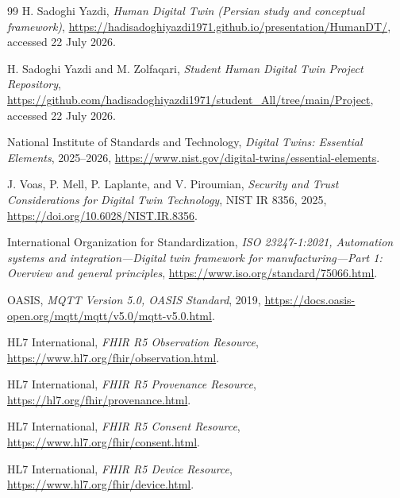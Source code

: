 \documentclass[11pt,a4paper]{article}
\begin{document}
\begin{thebibliography}{99}
H. Sadoghi Yazdi,
\textit{Human Digital Twin (Persian study and conceptual framework)},
\url{https://hadisadoghiyazdi1971.github.io/presentation/HumanDT/},
accessed 22 July 2026.

H. Sadoghi Yazdi and M. Zolfaqari,
\textit{Student Human Digital Twin Project Repository},
\url{https://github.com/hadisadoghiyazdi1971/student_All/tree/main/Project},
accessed 22 July 2026.

National Institute of Standards and Technology,
\textit{Digital Twins: Essential Elements}, 2025--2026,
\url{https://www.nist.gov/digital-twins/essential-elements}.

J. Voas, P. Mell, P. Laplante, and V. Piroumian,
\textit{Security and Trust Considerations for Digital Twin Technology},
NIST IR 8356, 2025,
\url{https://doi.org/10.6028/NIST.IR.8356}.

International Organization for Standardization,
\textit{ISO 23247-1:2021, Automation systems and integration---Digital twin framework for manufacturing---Part 1: Overview and general principles},
\url{https://www.iso.org/standard/75066.html}.

OASIS,
\textit{MQTT Version 5.0, OASIS Standard}, 2019,
\url{https://docs.oasis-open.org/mqtt/mqtt/v5.0/mqtt-v5.0.html}.

HL7 International,
\textit{FHIR R5 Observation Resource},
\url{https://www.hl7.org/fhir/observation.html}.

HL7 International,
\textit{FHIR R5 Provenance Resource},
\url{https://hl7.org/fhir/provenance.html}.

HL7 International,
\textit{FHIR R5 Consent Resource},
\url{https://www.hl7.org/fhir/consent.html}.

HL7 International,
\textit{FHIR R5 Device Resource},
\url{https://www.hl7.org/fhir/device.html}.
\end{thebibliography}
\end{document}
